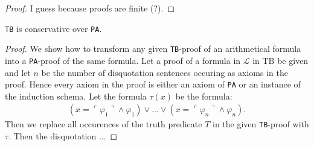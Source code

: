 \begin{proof}
    I guess because proofs are finite (?).
\end{proof}

\begin{theorem}
    \label{thm:tb-cons}
    \texttt{TB} is conservative over \texttt{PA}.
\end{theorem}

\begin{proof}   We show how to transform any given \texttt{TB}-proof of an arithmetical formula into a \texttt{PA}-proof of the same formula. Let a proof of a formula in $\mathcal{L}$ in TB be given and let $n$ be the number of disquotation sentences occuring as axioms in the proof. Hence every axiom in the proof is either an axiom of \texttt{PA} or an instance of the induction schema. Let the formula $\tau(x)$ be the formula: 
\begin{align*}
    (x = \ulcorner \varphi_1 \urcorner \land \varphi_1) \lor ... \lor (x = \ulcorner \varphi_n \urcorner \land \varphi_n).
\end{align*}
Then we replace all occurences of the truth predicate $T$ in the given \texttt{TB}-proof with $\tau$. Then the disquotation ...
\end{proof}

